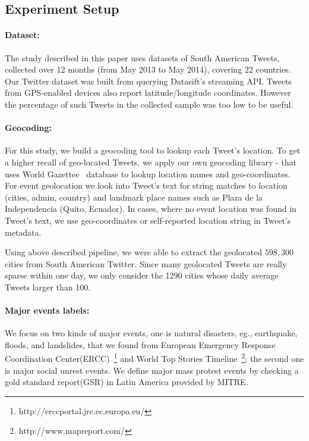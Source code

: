 
\subsection{Experiment Setup}
\paragraph{Dataset:}
The study described in this paper uses datasets of South American Tweets, collected over 12 months (from May 2013 to May 2014), covering 22 countries. Our Twitter dataset was built from querying Datasift's streaming API. Tweets from GPS-enabled devices also report latitude/longitude coordinates. However the percentage of such Tweets in the collected sample was too low to be useful.

\paragraph{Geocoding:}
For this study, we build a geocoding tool to lookup each Tweet's location. To get a higher recall of geo-located Tweets, we apply our own geocoding library - that uses World Gazettee~\cite{worldgazetteer} database to lookup location names and geo-coordinates. For event geolocation we look into Tweet's text for string matches to location (cities, admin, country) and landmark place names such as Plaza de la Independencia (Quito, Ecuador). In cases, where no event location was found in Tweet's text, we use geo-coordinates or self-reported location string in Tweet's metadata.

Using above described pipeline, we were able to extract the geolocated $598,300$ cities from South American Twitter. Since many geolocated Tweets are really sparse within one day, we only consider the 1290 cities whose daily average Tweets larger than 100.

\paragraph{Major events labels:}
We focus on two kinds of major events, one is natural disasters, eg., earthquake, floods, and landslides, that we found from European Emergency Response Coordination Center(ERCC)~\footnote{http://erccportal.jrc.ec.europa.eu/} and World Top Stories Timeline~\footnote{http://www.mapreport.com/}; the second one is major social unrest events. We define major mass protest events by checking a gold standard report(GSR) in Latin America provided by MITRE.


